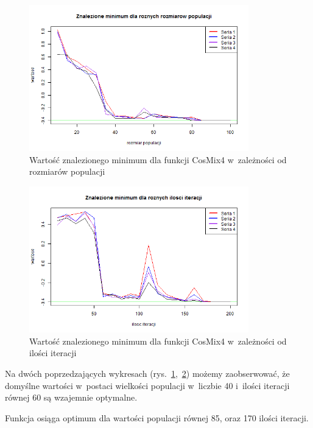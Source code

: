 \documentclass[11pt, a4paper]{article}
\newcommand{\fbi}{\leavevmode{\parindent=1em\indent}}
\begin{document}
\begin{figure}[H]
	\begin{center}
		\includegraphics[width=0.85\textwidth]{./assets/CosMix44.png}
		\caption{Wartość znalezionego minimum dla funkcji CosMix4 w~zależności od rozmiarów populacji}
		\label{fig:cosmix44}
	\end{center}
\end{figure}

\begin{figure}[H]
	\begin{center}
		\includegraphics[width=0.85\textwidth]{./assets/CosMix45.png}
		\caption{Wartość znalezionego minimum dla funkcji CosMix4 w~zależności od ilości iteracji}
		\label{fig:cosmix45}
	\end{center}
\end{figure}

\fbi
Na dwóch poprzedzających wykresach (rys.~\ref{fig:cosmix44},~\ref{fig:cosmix45}) możemy zaobserwować, że domyślne wartości w~postaci wielkości populacji w~liczbie 40 i~ilości iteracji równej 60 są wzajemnie optymalne.

\fbi
Funkcja osiąga optimum dla wartości populacji równej 85, oraz 170 ilości iteracji.
\end{document}

